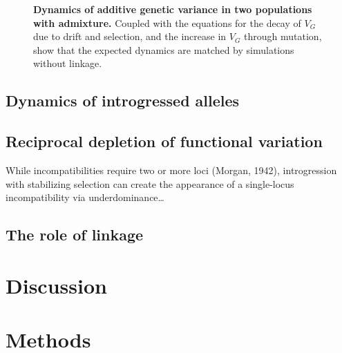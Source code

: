\documentclass{article}
\begin{document}
\begin{figure}[ht!]
    \centering
    \caption{
        \textbf{Dynamics of additive genetic variance in two populations with admixture.}
        Coupled with the equations for the decay of $V_G$ due to drift and selection,
        and the increase in $V_G$ through mutation, show that the expected dynamics
        are matched by simulations without linkage.
    }
    \label{fig:VG_dynamics}
\end{figure}

\subsection{Dynamics of introgressed alleles}

\subsection{Reciprocal depletion of functional variation}

While incompatibilities require two or more loci (Morgan, 1942), introgression
with stabilizing selection can create the appearance of a single-locus
incompatibility via underdominance\dots

\subsection{The role of linkage}

\section{Discussion}

\section{Methods}
\end{document}

